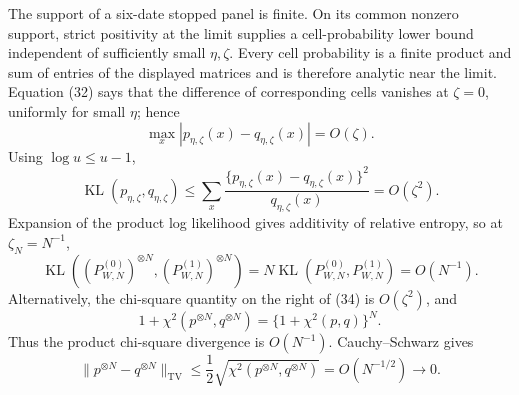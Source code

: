 The support of a six-date stopped panel is finite.  On its common nonzero support, strict positivity at the limit supplies a cell-probability lower bound independent of sufficiently small \(\eta,\zeta\).  Every cell probability is a finite product and sum of entries of the displayed matrices and is therefore analytic near the limit.  Equation (32) says that the difference of corresponding cells vanishes at \(\zeta=0\), uniformly for small \(\eta\); hence
\[
 \max_x|p_{\eta,\zeta}(x)-q_{\eta,\zeta}(x)|=O(\zeta).       \tag{33}
\]
Using \(\log u\le u-1\),
\[
 \operatorname{KL}(p_{\eta,\zeta},q_{\eta,\zeta})
 \le\sum_x\frac{\{p_{\eta,\zeta}(x)-q_{\eta,\zeta}(x)\}^2}{q_{\eta,\zeta}(x)}
 =O(\zeta^2).                                                  \tag{34}
\]
Expansion of the product log likelihood gives additivity of relative entropy, so at \(\zeta_N=N^{-1}\),
\[
 \operatorname{KL}\!\left((P_{W,N}^{(0)})^{\otimes N},(P_{W,N}^{(1)})^{\otimes N}\right)
 =N\operatorname{KL}(P_{W,N}^{(0)},P_{W,N}^{(1)})=O(N^{-1}).   \tag{35}
\]
Alternatively, the chi-square quantity on the right of (34) is \(O(\zeta^2)\), and
\[
 1+\chi^2(p^{\otimes N},q^{\otimes N})=\{1+\chi^2(p,q)\}^{N}.
\]
Thus the product chi-square divergence is \(O(N^{-1})\).  Cauchy--Schwarz gives
\[
 \|p^{\otimes N}-q^{\otimes N}\|_{\mathrm{TV}}
 \le\frac12\sqrt{\chi^2(p^{\otimes N},q^{\otimes N})}=O(N^{-1/2})\to0. \tag{36}
\]

